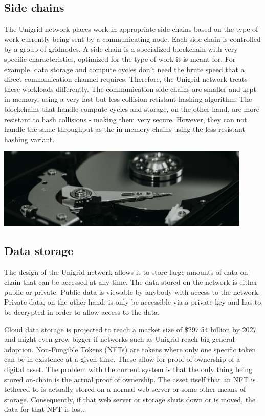 \documentclass{article}
\begin{document}
\subsection{Side chains}
The Unigrid network places work in appropriate side chains based on the type of work currently being sent by a communicating node. Each side chain is controlled by a group of gridnodes. A side chain is a specialized blockchain with very specific characteristics, optimized for the type of work it is meant for. For example, data storage and compute cycles don't need the brute speed that a direct communication channel requires. Therefore, the Unigrid network treats these workloads differently. The communication side chains are smaller and kept in-memory, using a very fast but less collision resistant hashing algorithm. The blockchains that handle compute cycles and storage, on the other hand, are more resistant to hash collisions - making them very secure. However, they can not handle the same throughput as the in-memory chains using the less resistant hashing variant.
\begin{mdframed}[style=textimage]
	\includegraphics[width=345pt]{hard-drive}
\end{mdframed}
\subsection{Data storage}
The design of the Unigrid network allows it to store large amounts of data on-chain that can be accessed at any time. The data stored on the network is either public or private. Public data is viewable by anybody with access to the network. Private data, on the other hand, is only be accessible via a private key and has to be decrypted in order to allow access to the data.

Cloud data storage is projected to reach a market size of \$297.54 billion by 2027 \cite{fort2021} and might even grow bigger if networks such as Unigrid reach big general adoption. Non-Fungible Tokens (NFTs) are tokens where only one specific token can be in existence at a given time. These allow for proof of ownership of a digital asset. The problem with the current system is that the only thing being stored on-chain is the actual proof of ownership. The asset itself that an NFT is tethered to is actually stored on a normal web server or some other means of storage. Consequently, if that web server or storage shuts down or is moved, the data for that NFT is lost.
\end{document}
